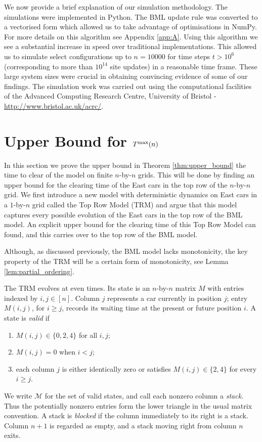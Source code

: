 \documentclass[reqno]{amsart}
\begin{document}
We now provide a brief explanation of our simulation methodology. The simulations were implemented in Python.  The BML update rule was converted to a vectorised form which allowed us to take advantage of optimisations in NumPy. For more details on this algorithm see Appendix \ref{app:A}. Using this algorithm we see a substantial increase in speed over traditional implementations. This allowed us to simulate select configurations up to $n=10000$ for time steps $t > 10^6$ (corresponding to more than $10^{14}$ site updates) in a reasonable time frame. These large system sizes were crucial in obtaining convincing evidence of some of our findings. The simulation work was carried out using the computational facilities of the Advanced Computing Research Centre, University of Bristol - \url{http://www.bristol.ac.uk/acrc/}. 

\section{Upper Bound for \texorpdfstring{$T^{\text{\rm max}}(n)$}{the Maximal Clearing Time}}

In this section we prove the upper bound in Theorem \ref{thm:upper_bound} the time to clear of the model on finite $n$-by-$ n$ grids. This will be done by finding an upper bound for the clearing time of the East cars in the top row of the $n$-by-$ n$ grid. We first introduce a new model with deterministic dynamics on East cars in a $1 $-by-$ n$ grid called the Top Row Model (TRM) and argue that this model captures every possible evolution of the East cars in the top row of the BML model. An explicit upper bound for the clearing time of this Top Row Model can found, and this carries over to the top row of the BML model.

Although, as discussed previously, the BML model lacks monotonicity, the key property of the TRM will be a certain form of monotonicity, see Lemma \ref{lem:partial_ordering}.

The TRM evolves at even times. Its state is an $n$-by-$n$ matrix $M$ with
entries indexed by $i,j\in[n]$. Column $j$ represents a car currently in
position $j$; entry $M(i,j)$, for $i\geq j$, records its waiting time at
the present or future position $i$. A state is \emph{valid} if
\begin{enumerate}
\item $M(i,j)\in\{0,2,4\}$ for all $i,j$;
\item $M(i,j)=0$ when $i<j$;
\item each column $j$ is either identically zero or satisfies
$M(i,j)\in\{2,4\}$ for every $i\geq j$.
\end{enumerate}
We write $\mathcal M$ for the set of valid states, and call each nonzero
column a \emph{stack}. Thus the potentially nonzero entries form the
lower triangle in the usual matrix convention. A stack is \emph{blocked}
if the column immediately to its right is a stack. Column $n+1$ is
regarded as empty, and a stack moving right from column $n$ exits.
\end{document}
